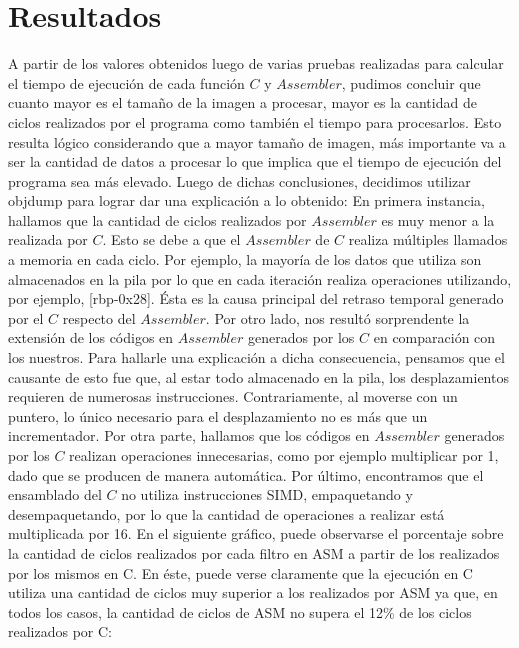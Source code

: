 \documentclass[10pt, a4paper]{article}
\begin{document}
\section{Resultados}
A partir de los valores obtenidos luego de varias pruebas realizadas para calcular el tiempo de ejecución de cada función $C$ y $Assembler$, pudimos concluir que cuanto mayor es el tamaño de la imagen a procesar, mayor es la cantidad de ciclos realizados por el programa como también el tiempo para procesarlos. Esto resulta lógico considerando que a mayor tamaño de imagen, más importante va a ser la cantidad de datos a procesar lo que implica que el tiempo de ejecución del programa sea más elevado.\newline
Luego de dichas conclusiones, decidimos utilizar objdump para lograr dar una explicación a lo obtenido:\newline
En primera instancia, hallamos que la cantidad de ciclos realizados por $Assembler$ es muy menor a la realizada por $C$. Esto se debe a que el $Assembler$ de $C$ realiza múltiples llamados a memoria en cada ciclo. Por ejemplo, la mayoría de los datos que utiliza son almacenados en la pila por lo que en cada iteración realiza operaciones utilizando, por ejemplo, [rbp-0x28]. Ésta es la causa principal del retraso temporal generado por el $C$ respecto del $Assembler$. \newline 
Por otro lado, nos resultó sorprendente la extensión de los códigos en $Assembler$ generados por los $C$ en comparación con los nuestros. Para hallarle una explicación a dicha consecuencia, pensamos que el causante de esto fue que, al estar todo almacenado en la pila, los desplazamientos requieren de numerosas instrucciones. Contrariamente, al moverse con un puntero, lo único necesario para el desplazamiento no es más que un incrementador. \newline
Por otra parte, hallamos que los códigos en $Assembler$ generados por los $C$ realizan operaciones innecesarias, como por ejemplo multiplicar por 1, dado que se producen de manera automática.\newline
Por último, encontramos que el ensamblado del $C$ no utiliza instrucciones SIMD, empaquetando y desempaquetando, por lo que la cantidad de operaciones a realizar está multiplicada por 16.\newline
En el siguiente gráfico, puede observarse el porcentaje sobre la cantidad de ciclos realizados por cada filtro en ASM a partir de los realizados por los mismos en C. En éste, puede verse claramente que la ejecución en C utiliza una cantidad de ciclos muy superior a los realizados por ASM ya que, en todos los casos, la cantidad de ciclos de ASM no supera el 12\% de los ciclos realizados por C:\newline
\end{document}
